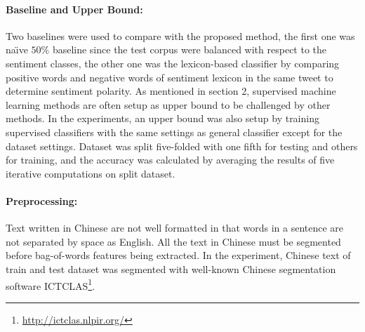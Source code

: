 \documentclass{llncs}
\begin{document}
\paragraph{Baseline and Upper Bound:}
Two baselines were used to compare with the proposed method, the first one was na\"\i ve $ 50\% $ baseline since the test corpus were balanced with respect to the sentiment classes, the other one was the lexicon-based classifier by comparing positive words and negative words of sentiment lexicon in the same tweet to determine sentiment polarity.
As mentioned in section 2, supervised machine learning methods are often setup as upper bound to be challenged by other methods. 
In the experiments, an upper bound was also setup by training supervised classifiers with the same 
settings as general classifier except for the dataset settings.  
Dataset was split five-folded with one fifth for testing and others for training, and the accuracy was calculated by averaging the results of five iterative computations on split dataset.
\paragraph{Preprocessing:}
Text written in Chinese are not well formatted in that words in a sentence are not separated by space as English. 
All the text in Chinese must be segmented before bag-of-words features being extracted. 
In the experiment, Chinese text of train and test dataset was segmented with well-known Chinese segmentation software ICTCLAS\footnote{\url{http://ictclas.nlpir.org/}}.
\end{document}
